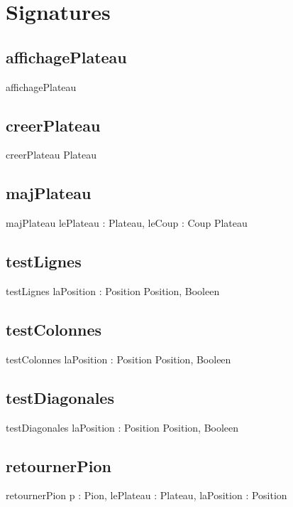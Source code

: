 
\section{Signatures}
	\subsection{affichagePlateau}
		\begin{algorithme}
			\signatureprocedure
				{affichagePlateau}
				{}
		\end{algorithme}
	\subsection{creerPlateau}
		\begin{algorithme}
			\signaturefonction
				{creerPlateau}
				{}
				{Plateau}
		\end{algorithme}
	\subsection{majPlateau}
		\begin{algorithme}
			\signaturefonction
				{majPlateau}
				{lePlateau : Plateau, leCoup : Coup}
				{Plateau}
		\end{algorithme}
	\subsection{testLignes}
		\begin{algorithme}
			\signaturefonction
				{testLignes}
				{laPosition : Position}
				{Position, Booleen}
		\end{algorithme}
	\subsection{testColonnes}
		\begin{algorithme}
			\signaturefonction
				{testColonnes}
				{laPosition : Position}
				{Position, Booleen}
		\end{algorithme}
	\subsection{testDiagonales}
		\begin{algorithme}
			\signaturefonction
				{testDiagonales}
				{laPosition : Position}
				{Position, Booleen}
		\end{algorithme}
	\subsection{retournerPion}
		\begin{algorithme}
			\signatureprocedure
				{retournerPion}
				{p : Pion, lePlateau : Plateau, laPosition : Position}
		\end{algorithme}
